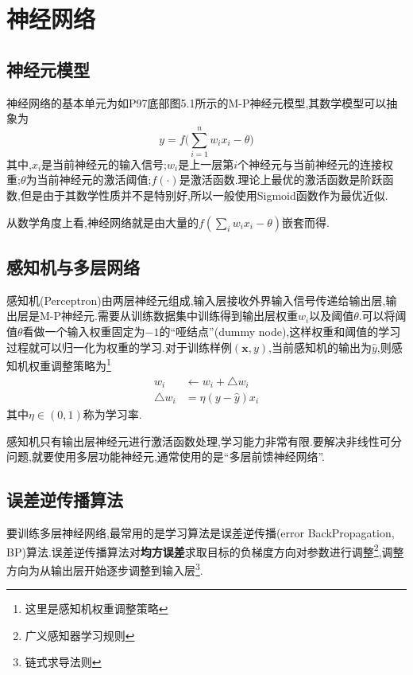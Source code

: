 \chapter{神经网络}

\section{神经元模型}

神经网络的基本单元为如P97底部图5.1所示的M-P神经元模型,其数学模型可以抽象为
\begin{equation}
y=f\Big(\sum_{i=1}^nw_ix_i-\theta\Big)
\end{equation}
其中,$x_i$是当前神经元的输入信号;$w_i$是上一层第$i$个神经元与当前神经元的连接权重;$\theta$为当前神经元的激活阈值;$f(\cdot)$是激活函数.理论上最优的激活函数是阶跃函数,但是由于其数学性质并不是特别好,所以一般使用Sigmoid函数作为最优近似.

从数学角度上看,神经网络就是由大量的$f(\sum_iw_ix_i-\theta)$嵌套而得.

\section{感知机与多层网络}

感知机(Perceptron)由两层神经元组成,输入层接收外界输入信号传递给输出层,输出层是M-P神经元.需要从训练数据集中训练得到输出层权重$w_i$以及阈值$\theta$.可以将阈值$\theta$看做一个输入权重固定为$-1$的``哑结点''(dummy node),这样权重和阈值的学习过程就可以归一化为权重的学习.对于训练样例$(\mathbf x,y)$,当前感知机的输出为$\hat y$,则感知机权重调整策略为\footnote{这里是感知机权重调整策略}
\begin{equation}\begin{split}
w_i&\leftarrow w_i+\bigtriangleup w_i \\
\bigtriangleup w_i&=\eta(y-\hat y)x_i
\end{split}\end{equation}
其中$\eta\in (0,1)$称为学习率.

感知机只有输出层神经元进行激活函数处理,学习能力非常有限.要解决非线性可分问题,就要使用多层功能神经元,通常使用的是``多层前馈神经网络''.

\section{误差逆传播算法}

要训练多层神经网络,最常用的是学习算法是误差逆传播(error BackPropagation, BP)算法.误差逆传播算法对\textbf{均方误差}求取目标的负梯度方向对参数进行调整\footnote{广义感知器学习规则},调整方向为从输出层开始逐步调整到输入层\footnote{链式求导法则}.

